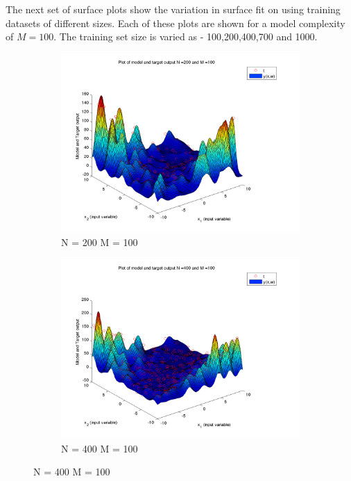 \documentclass{article}
\begin{document}
\begin{flushleft}
The next set of surface plots show the variation in surface fit on using training datasets of different sizes. Each of these plots are shown for a model complexity of $M = 100$. The training set size is varied as - 100,200,400,700 and 1000. 

\end{flushleft}
\begin{figure}[H]

\begin{subfigure}{.5\textwidth}
\centering
\includegraphics[width=\linewidth]{D2/VaryingN_N200M100}
\caption{N = 200 M = 100}
\end{subfigure}
\begin{subfigure}{.5\textwidth}
\includegraphics[width=\linewidth]{D2/VaryingN_N400M100}
\caption{N = 400 M = 100}
\end{subfigure}



\end{figure}
\end{document}
